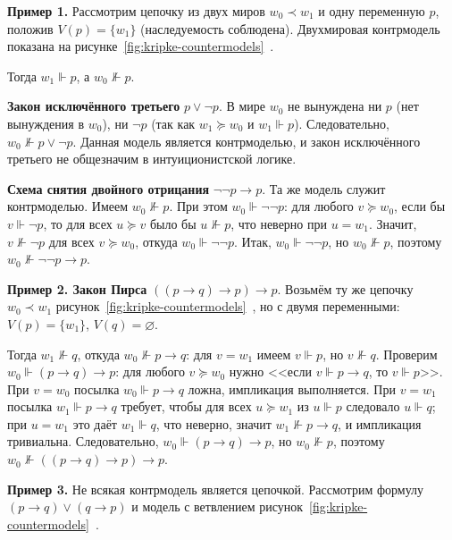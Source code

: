 \documentclass[14pt, russian]{scrartcl}
\begin{document}
\textbf{Пример 1.} Рассмотрим цепочку из двух миров $w_0 \prec w_1$ и одну
переменную $p$, положив $V(p) = \{w_1\}$ (наследуемость соблюдена).
Двухмировая контрмодель показана на рисунке~\ref{fig:kripke-countermodels}~.

Тогда $w_1 \Vdash p$, а $w_0 \not\Vdash p$.

\textbf{Закон исключённого третьего} $p \lor \neg p$. В мире $w_0$ не вынуждена
ни $p$ (нет вынуждения в $w_0$), ни $\neg p$ (так как $w_1 \succeq w_0$ и $w_1
\Vdash p$). Следовательно, $w_0 \not\Vdash p \lor \neg p$. Данная модель
является контрмоделью, и закон исключённого третьего не общезначим в
интуиционистской логике.

\textbf{Схема снятия двойного отрицания} $\neg\neg p \rightarrow p$. Та же модель
служит контрмоделью. Имеем $w_0 \not\Vdash p$. При этом $w_0 \Vdash \neg\neg p$:
для любого $v \succeq w_0$, если бы $v \Vdash \neg p$, то для всех $u \succeq v$
было бы $u \not\Vdash p$, что неверно при $u = w_1$. Значит,
$v \not\Vdash \neg p$ для всех $v \succeq w_0$, откуда $w_0 \Vdash \neg\neg p$.
Итак, $w_0 \Vdash \neg\neg p$, но $w_0 \not\Vdash p$, поэтому
$w_0 \not\Vdash \neg\neg p \rightarrow p$.

\textbf{Пример 2. Закон Пирса} $((p \rightarrow q) \rightarrow p) \rightarrow p$.
Возьмём ту же цепочку $w_0 \prec w_1$ рисунок~\ref{fig:kripke-countermodels}~, но с двумя
переменными: $V(p) = \{w_1\}$, $V(q) = \varnothing$.

Тогда $w_1 \not\Vdash q$, откуда $w_0 \not\Vdash p \rightarrow q$: для
$v = w_1$ имеем $v \Vdash p$, но $v \not\Vdash q$. Проверим
$w_0 \Vdash (p \rightarrow q) \rightarrow p$: для любого $v \succeq w_0$ нужно
<<если $v \Vdash p \rightarrow q$, то $v \Vdash p$>>. При $v = w_0$ посылка
$w_0 \Vdash p \rightarrow q$ ложна, импликация выполняется. При $v = w_1$
посылка $w_1 \Vdash p \rightarrow q$ требует, чтобы для всех $u \succeq w_1$ из
$u \Vdash p$ следовало $u \Vdash q$; при $u = w_1$ это даёт $w_1 \Vdash q$, что
неверно, значит $w_1 \not\Vdash p \rightarrow q$, и импликация тривиальна.
Следовательно, $w_0 \Vdash (p \rightarrow q) \rightarrow p$, но
$w_0 \not\Vdash p$, поэтому
$w_0 \not\Vdash ((p \rightarrow q) \rightarrow p) \rightarrow p$.

\textbf{Пример 3.} Не всякая контрмодель является цепочкой. Рассмотрим формулу
$(p \rightarrow q) \lor (q \rightarrow p)$ и модель с ветвлением
рисунок~\ref{fig:kripke-countermodels}~.
\end{document}
